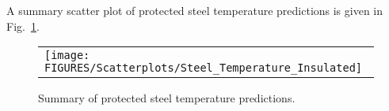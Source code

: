 A summary scatter plot of protected steel temperature predictions is given in Fig.~\ref{protected_steel_temperature_summary}.

\begin{figure}[ht]
\begin{center}
\begin{tabular}{l}
\texttt{[image: FIGURES/Scatterplots/Steel\_Temperature\_Insulated]}
\end{tabular}
\end{center}
\caption[Summary of protected steel temperature predictions.]
{Summary of protected steel temperature predictions.}
\label{protected_steel_temperature_summary}
\end{figure}

